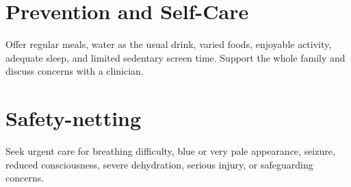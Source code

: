 \section*{Prevention and Self-Care}
Offer regular meals, water as the usual drink, varied foods, enjoyable activity, adequate sleep, and limited sedentary screen time. Support the whole family and discuss concerns with a clinician.
\section*{Safety-netting}
Seek urgent care for breathing difficulty, blue or very pale appearance, seizure, reduced consciousness, severe dehydration, serious injury, or safeguarding concerns.
